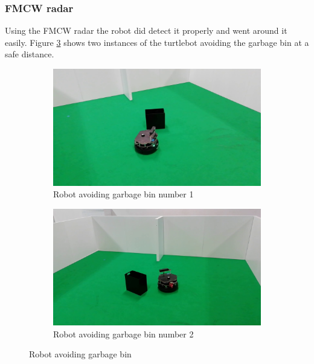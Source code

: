 \subsubsection*{FMCW radar}
Using the \ac{FMCW} radar the robot did detect it properly and went around it easily.
 Figure \ref{fig:garbageRS} shows two instances of the turtlebot avoiding the garbage bin at a safe distance.
\begin{figure}[h!]
  \centering
  \begin{subfigure}[b]{0.49\linewidth}
    \includegraphics[width=\linewidth]{imgs/chapter5/garbageRS.png}
     \caption{Robot avoiding garbage bin number 1}
     \label{fig::garbageRS1}
  \end{subfigure}
  \begin{subfigure}[b]{0.49\linewidth}
    \includegraphics[width=\linewidth]{imgs/chapter5/garbageRS2.png}
    \caption{Robot avoiding garbage bin  number 2}
    \label{fig::garbageRS2}
  \end{subfigure}
  \caption{Robot avoiding garbage bin}
  \label{fig:garbageRS}
\end{figure}

